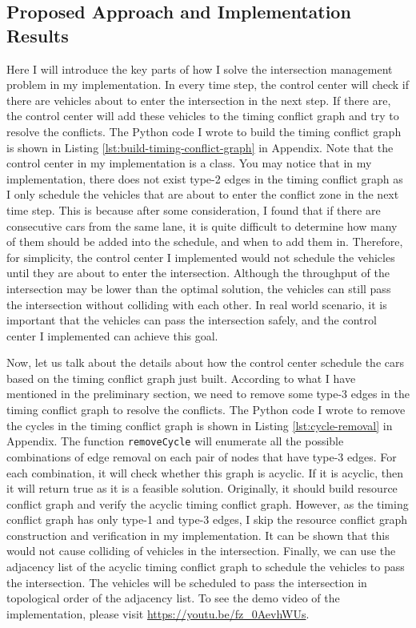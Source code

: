 \documentclass{article}
\begin{document}
\begin{multicols*}{1}
    \section{Proposed Approach and Implementation Results}
    Here I will introduce the key parts of how I solve the intersection management problem in my implementation. In every time step, the control center will check if there are vehicles about to enter the intersection in the next step. If there are, the control center will add these vehicles to the timing conflict graph and try to resolve the conflicts. The Python code I wrote to build the timing conflict graph is shown in Listing \ref{lst:build-timing-conflict-graph} in Appendix. Note that the control center in my implementation is a class. You may notice that in my implementation, there does not exist type-2 edges in the timing conflict graph as I only schedule the vehicles that are about to enter the conflict zone in the next time step. This is because after some consideration, I found that if there are consecutive cars from the same lane, it is quite difficult to determine how many of them should be added into the schedule, and when to add them in. Therefore, for simplicity, the control center I implemented would not schedule the vehicles until they are about to enter the intersection. Although the throughput of the intersection may be lower than the optimal solution, the vehicles can still pass the intersection without colliding with each other. In real world scenario, it is important that the vehicles can pass the intersection safely, and the control center I implemented can achieve this goal.
    
    Now, let us talk about the details about how the control center schedule the cars based on the timing conflict graph just built. According to what I have mentioned in the preliminary section, we need to remove some type-3 edges in the timing conflict graph to resolve the conflicts. The Python code I wrote to remove the cycles in the timing conflict graph is shown in Listing \ref{lst:cycle-removal} in Appendix. The function \texttt{removeCycle} will enumerate all the possible combinations of edge removal on each pair of nodes that have type-3 edges. For each combination, it will check whether this graph is acyclic. If it is acyclic, then it will return true as it is a feasible solution. Originally, it should build resource conflict graph and verify the acyclic timing conflict graph. However, as the timing conflict graph has only type-1 and type-3 edges, I skip the resource conflict graph construction and verification in my implementation. It can be shown that this would not cause colliding of vehicles in the intersection. Finally, we can use the adjacency list of the acyclic timing conflict graph to schedule the vehicles to pass the intersection. The vehicles will be scheduled to pass the intersection in topological order of the adjacency list. To see the demo video of the implementation, please visit \url{https://youtu.be/fz_0AevhWUs}.


\end{multicols*}
\end{document}
